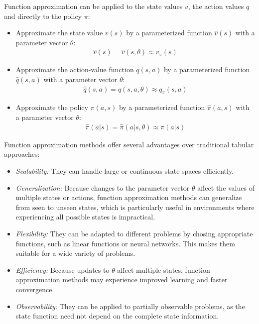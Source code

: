 Function approximation can be applied to the state values $v$, the action values $q$ and directly to the policy $\pi$:
\begin{itemize}
\item Approximate the state value $v(s)$ by a parameterized function $\hat{v}(s)$ with a parameter vector $\theta$:\\
\begin{align*}
\hat{v}(s) = \hat{v}(s, \theta) \approx v_{\pi}(s)
\end{align*}
\item Approximate the action-value function $q(s, a)$ by a parameterized function $\hat{q}(s, a)$ with a parameter vector $\theta$:
\begin{align*}
\hat{q}(s, a) = \hat{q}(s, a, \theta) \approx q_{\pi}(s, a)
\end{align*}
\item Approximate the policy $\pi(a, s)$ by a parameterized function $\hat{\pi}(a, s)$ with a parameter vector $\theta$:
\begin{align*}
\hat{\pi}(a | s) = \hat{\pi}(a | s, \theta) \approx \pi(a | s)
\end{align*}
\end{itemize}

Function approximation methods offer several advantages over traditional tabular approaches:
\begin{itemize}
\item \emph{Scalability:} They can handle large or continuous state spaces efficiently.
\item \emph{Generalization:} Because changes to the parameter vector $\theta$ affect the values of multiple states or actions, function approximation methods can generalize from seen to unseen states, which is particularly useful in environments where experiencing all possible states is impractical.
\item \emph{Flexibility:} They can be adapted to different problems by chosing appropriate functions, such as linear functions or neural networks. This makes them suitable for a wide variety of problems.
\item \emph{Efficiency:} Because updates to $\theta$ affect multiple states, function approximation methods may experience improved learning and faster convergence.
\item \emph{Observability:} They can be applied to partially observable problems, as the state function need not depend on the complete state information. 
\end{itemize}

